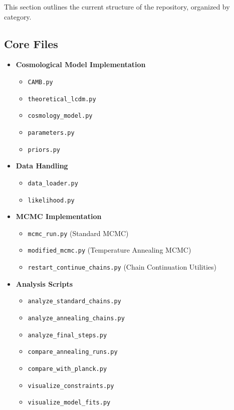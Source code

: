 \documentclass[11pt]{article}
\begin{document}
This section outlines the current structure of the repository, organized by category.

\subsection{Core Files}

\begin{itemize}
    \item \textbf{Cosmological Model Implementation}
    \begin{itemize}
        \item \texttt{CAMB.py}
        \item \texttt{theoretical\_lcdm.py}
        \item \texttt{cosmology\_model.py}
        \item \texttt{parameters.py}
        \item \texttt{priors.py}
    \end{itemize}
    
    \item \textbf{Data Handling}
    \begin{itemize}
        \item \texttt{data\_loader.py}
        \item \texttt{likelihood.py}
    \end{itemize}
    
    \item \textbf{MCMC Implementation}
    \begin{itemize}
        \item \texttt{mcmc\_run.py} (Standard MCMC)
        \item \texttt{modified\_mcmc.py} (Temperature Annealing MCMC)
        \item \texttt{restart\_continue\_chains.py} (Chain Continuation Utilities)
    \end{itemize}
    
    \item \textbf{Analysis Scripts}
    \begin{itemize}
        \item \texttt{analyze\_standard\_chains.py}
        \item \texttt{analyze\_annealing\_chains.py}
        \item \texttt{analyze\_final\_steps.py}
        \item \texttt{compare\_annealing\_runs.py}
        \item \texttt{compare\_with\_planck.py}
        \item \texttt{visualize\_constraints.py}
        \item \texttt{visualize\_model\_fits.py}
    \end{itemize}
    

\end{itemize}
\end{document}
